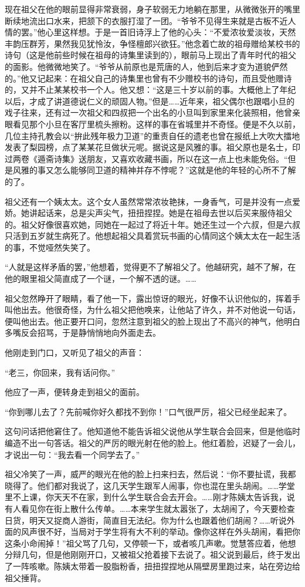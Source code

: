 \par 现在祖父在他的眼前显得非常衰弱，身子软弱无力地躺在那里，从微微张开的嘴里断续地流出口水来，把颔下的衣服打湿了一团。“爷爷不见得生来就是古板不近人情的罢。”他心里这样想。于是一首旧诗浮上了他的心头：“不爱浓妆爱淡妆，天然丰韵压群芳，果然我见犹怜汝，争怪檀郎兴欲狂。”他念着亡故的祖母赠给某校书的诗句（这是他前些时候在祖母的诗集里读到的），眼前马上现出了青年时代的祖父的面影。他微微地笑了。“爷爷从前原也是荒唐的人，他到后来才变为道貌俨然的。”他又记起来：在祖父自己的诗集里也曾有不少赠校书的诗句，而且受他赠诗的，又并不止某某校书一个人。他又想：“这是三十岁以前的事。大概他上了年纪以后，才成了讲道德说仁义的顽固人物。”但是……近年来，祖父偶尔也跟唱小旦的戏子往来，还有过一次祖父和四叔把一个出名的小旦叫到家里来化装照相，他曾亲眼看见那个小旦在客厅里梳头擦粉。这样的事在省城里并不奇怪。便是不久以前，几位主持孔教会以“拚此残年极力卫道”的重责自任的遗老也曾在报纸上大吹大擂地发表了梨园榜，点了某某花旦做状元呢。据说这是风雅的事。祖父原也是名士，印过两卷《遁斋诗集》送朋友，又喜欢收藏书画，所以在这一点上也未能免俗。“但是风雅的事又怎么能够同卫道的精神并存不悖呢？”这就是他的年轻的心所不了解的了。
\par 祖父还有一个姨太太。这个女人虽然常常浓妆艳抹，一身香气，可是并没有一点爱娇。她讲起话来，总是尖声尖气，扭扭捏捏。她是在祖母去世以后买来服侍祖父的。祖父好像很喜欢她，同她在一起过了将近十年。她还生过一个六叔，但是六叔只活到五岁就生病死了。他想起祖父具着赏玩书画的心情同这个姨太太在一起生活的事，不觉哑然失笑了。
\par “人就是这样矛盾的罢，”他想着，觉得更不了解祖父了。他越研究，越不了解，在他的眼里祖父简直成了一个谜，一个解不透的谜。……
\par 祖父忽然睁开了眼睛，看了他一下，露出惊讶的眼光，好像不认识他似的，挥着手叫他出去。他很奇怪，为什么祖父把他唤来，让他站了许久，并不对他说一句话，便叫他出去。他正要开口问，忽然注意到祖父的脸上现出了不高兴的神气，他明白多嘴反会招骂，于是静悄悄地向外面走去。
\par 他刚走到门口，又听见了祖父的声音：
\par “老三，你回来，我有话问你。”
\par 他应了一声，便转身走到祖父的面前。
\par “你到哪儿去了？先前喊你好久都找不到你！”口气很严厉，祖父已经坐起来了。
\par 这句问话把他窘住了。他知道他不能告诉祖父说他从学生联合会回来，但是他临时编造不出一句答话。祖父的严厉的眼光射在他的脸上。他红着脸，迟疑了一会儿，才说出一句：“我去看一个同学去了。”
\par 祖父冷笑了一声，威严的眼光在他的脸上扫来扫去，然后说：“你不要扯谎，我都晓得了。他们都对我说了，这几天学生跟军人闹事，你也混在里头胡闹。……学堂里不上课，你天天不在家，到什么学生联合会去开会。……刚才陈姨太告诉我，说有人看见你在街上散什么传单。……本来学生就太嚣张了，太胡闹了，今天要检查日货，明天又捉商人游街，简直目无法纪。你为什么也跟着他们胡闹？……听说外面的风声很不好，当局对于学生将有大不利的举动。像你这样在外头胡闹，看把你这条小命闹掉！”祖父骂了几句，又停顿一下，或者咳几声嗽。觉慧答应着，他想分辩几句，但是他刚刚开口，又被祖父抢着接下去说了。祖父说到最后，终于发出了一阵咳嗽。陈姨太带着一股脂粉香，扭扭捏捏地从隔壁房里跑过来，站在旁边给祖父捶背。

